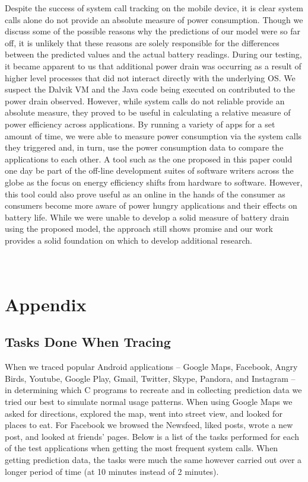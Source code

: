 \documentclass[11pt]{article}
\begin{document}
Despite the success of system call tracking on the mobile device, it is clear system calls alone do not provide an absolute measure of power consumption.  Though
we discuss some of the possible reasons why the predictions of our model were so far off, it is unlikely that these reasons are solely responsible for the
differences between the predicted values and the actual battery readings.  During our testing, it became apparent to us that additional power drain was
occurring as a result of higher level processes that did not interact directly with the underlying OS.  We suspect the Dalvik VM and the Java code being
executed on contributed to the power drain observed.  However, while system calls do not reliable provide an absolute measure, they proved to be useful in
calculating a relative measure of power efficiency across applications.  By running a variety of apps for a set amount of time, we were able to measure
power consumption via the system calls they triggered and, in turn, use the power consumption data to compare the applications to each other.  A tool such as
the one proposed in this paper could one day be part of the off-line development suites of software writers across the globe as the focus on energy efficiency shifts
from hardware to software.  However, this tool could also prove useful as an online in the hands of the consumer as consumers become more aware of power hungry applications and their effects on battery life.  While we were unable to develop a solid measure of battery drain using the proposed model, the approach still shows promise and our work provides a solid foundation on which to develop additional research.




\newpage
\appendix
\section{\\Appendix} \label{App:AppendixA}

\subsection{Tasks Done When Tracing}

When we traced popular Android applications -- Google Maps, 
Facebook, Angry Birds, Youtube, Google Play, Gmail, Twitter, Skype, Pandora, and Instagram --
in determining which C programs to recreate and in collecting prediction data we tried our
best to simulate normal usage patterns.  When using Google Maps we asked for directions, explored
the map, went into street view, and looked for places to eat. For Facebook we browsed the Newsfeed, 
liked posts, wrote a new post, and looked at friends' pages.  Below is a list of the tasks performed 
for each of the test applications when getting the most frequent system calls. When getting prediction
data, the tasks were much the same however carried out over a longer period of time (at 10 minutes instead
of 2 minutes).
\end{document}
